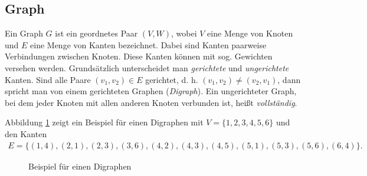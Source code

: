\subsection{Graph}
\begin{defi}
	Ein Graph $G$ ist ein geordnetes Paar $(V,W)$, wobei $V$ eine Menge von Knoten und $E$ eine Menge von Kanten bezeichnet. Dabei sind Kanten paarweise Verbindungen zwischen Knoten. Diese Kanten können mit sog. Gewichten versehen werden. Grundsätzlich unterscheidet man \emph{gerichtete} und \emph{ungerichtete} Kanten. Sind alle Paare $(v_1, v_2) \in E$ gerichtet, d. h. $(v_1, v_2) \neq (v_2, v_1)$, dann spricht man von einem gerichteten Graphen (\emph{Digraph}). Ein ungerichteter Graph, bei dem jeder Knoten mit allen anderen Knoten verbunden ist, heißt \emph{vollständig}.
\end{defi}

\begin{bsp}
	Abbildung \ref{digraph} zeigt ein Beispiel für einen Digraphen mit $V=\{1,2,3,4,5,6\}$ und den Kanten
	\begin{gather*}
		E=\{(1,4), (2,1), (2,3), (3,6), (4,2), (4,3), (4,5), (5,1), (5,3), (5,6), (6,4)\}.
	\end{gather*}
	\label{bsp:digraph}
\end{bsp}

\begin{figure}[!h]
	\centering
	\caption{Beispiel für einen Digraphen}
	\label{digraph}
\end{figure}

